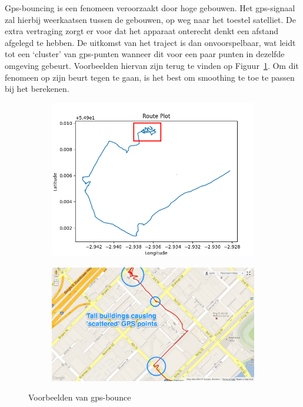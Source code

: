 Gps-bouncing is een fenomeen veroorzaakt door hoge gebouwen. Het
\ac{gps}-signaal zal hierbij weerkaatsen tussen de gebouwen, op weg naar het
toestel satelliet. De extra vertraging zorgt er voor dat het apparaat onterecht
denkt een afstand afgelegd te hebben. De uitkomst van het traject is dan
onvoorspelbaar, wat leidt tot een `cluster' van \ac{gps}-punten wanneer dit
voor een paar punten in dezelfde omgeving gebeurt. Voorbeelden hiervan zijn
terug te vinden op Figuur~\ref{fig:gps_bounce}. Om dit fenomeen op zijn beurt
tegen te gaan, is het best om smoothing te toe te passen bij het berekenen.
\begin{figure}
    \centering
    \begin{subfigure}[b]{0.49\textwidth}
        \centering
        \includegraphics[width=\textwidth]{fig/Afwijkingen&Analyses/Crooked Routes/Crooked GPS Route_Cart.png}
    \end{subfigure}
    \begin{subfigure}[b]{0.49\textwidth}
        \centering
        \includegraphics[width=\textwidth]{fig/Afwijkingen&Analyses/Crooked Routes/GPS_bounce_map.jpg}
    \end{subfigure}
    \caption{Voorbeelden van \ac{gps}-bounce~\cite{BadGPSDa19:online}}\label{fig:gps_bounce}
\end{figure}

